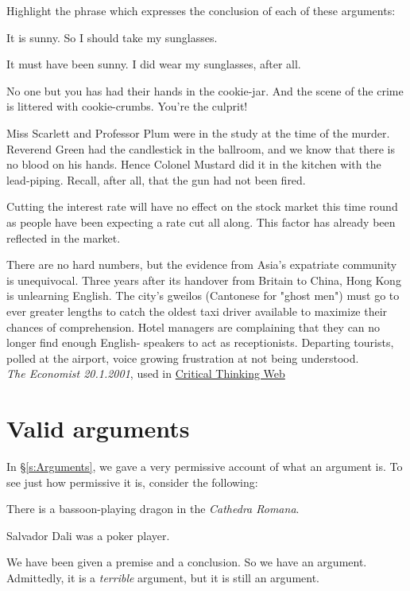 Highlight the phrase which expresses the conclusion of each of these arguments:
\begin{earg}
	\item It is sunny. So I should take my sunglasses.
	\item It must have been sunny. I did wear my sunglasses, after all.
	\item No one but you has had their hands in the cookie-jar. And the scene of the crime is littered with cookie-crumbs. You're the culprit!
	\item Miss Scarlett and Professor Plum were in the study at the time of the murder. Reverend Green had the candlestick in the ballroom, and we know that there is no blood on his hands. Hence Colonel Mustard did it in the kitchen with the lead-piping. Recall, after all, that the gun had not been fired.
	\item Cutting the interest rate will have no effect on the stock market this time round as people have been expecting a rate cut all along. This factor has already been reflected in the market.
	\item There are no hard numbers, but the evidence from Asia's expatriate community is unequivocal. Three years after its handover from Britain to China, Hong Kong is unlearning English. The city's gweilos (Cantonese for "ghost men") must go to ever greater lengths to catch the oldest taxi driver available to maximize their chances of comprehension. Hotel managers are complaining that they can no longer find enough English- speakers to act as receptionists. Departing tourists, polled at the airport, voice growing frustration at not being understood. \\ \emph{The Economist 20.1.2001}, used in \href{https://philosophy.hku.hk/think/arg/arg.php}{Critical Thinking Web}
\end{earg}


\chapter{Valid arguments}
\label{s:Valid}

In \S\ref{s:Arguments}, we gave a very permissive account of what an argument is. To see just how permissive it is, consider the following:
	\begin{earg}
		\item[] There is a bassoon-playing dragon in the \emph{Cathedra Romana}.
		\item[\therefore] Salvador Dali was a poker player.
	\end{earg}
We have been given a premise and a conclusion. So we have an argument. Admittedly, it is a \emph{terrible} argument, but it is still an argument.


